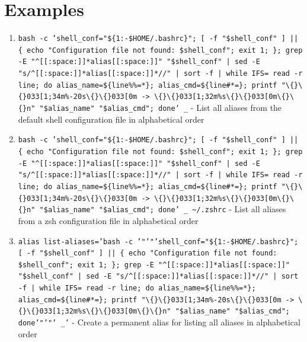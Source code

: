 \documentclass[openany]{book}
\begin{document}
\section*{Examples}
\begin{enumerate}
  \item \texttt{bash -c 'shell\_conf="\$\{1:-\$HOME/.bashrc\}"; [ -f "\$shell\_conf" ] || \{ echo "Configuration file not found: \$shell\_conf"; exit 1; \}; grep -E "\textasciicircum{}[[:space:]]*alias[[:space:]]" "\$shell\_conf" | sed -E "s/\textasciicircum{}[[:space:]]*alias[[:space:]]*//" | sort -f | while IFS= read -r line; do alias\_name=\$\{line\%\%=*\}; alias\_cmd=\$\{line\#*=\}; printf "\textbackslash\{\}\textbackslash\{\}033[1;34m\%-20s\textbackslash\{\}\textbackslash\{\}033[0m -> \textbackslash\{\}\textbackslash\{\}033[1;32m\%s\textbackslash\{\}\textbackslash\{\}033[0m\textbackslash\{\}\textbackslash\{\}n" "\$alias\_name" "\$alias\_cmd"; done' \_} - List all aliases from the default shell configuration file in alphabetical order
  \item \texttt{bash -c 'shell\_conf="\$\{1:-\$HOME/.bashrc\}"; [ -f "\$shell\_conf" ] || \{ echo "Configuration file not found: \$shell\_conf"; exit 1; \}; grep -E "\textasciicircum{}[[:space:]]*alias[[:space:]]" "\$shell\_conf" | sed -E "s/\textasciicircum{}[[:space:]]*alias[[:space:]]*//" | sort -f | while IFS= read -r line; do alias\_name=\$\{line\%\%=*\}; alias\_cmd=\$\{line\#*=\}; printf "\textbackslash\{\}\textbackslash\{\}033[1;34m\%-20s\textbackslash\{\}\textbackslash\{\}033[0m -> \textbackslash\{\}\textbackslash\{\}033[1;32m\%s\textbackslash\{\}\textbackslash\{\}033[0m\textbackslash\{\}\textbackslash\{\}n" "\$alias\_name" "\$alias\_cmd"; done' \_ \textasciitilde{}/.zshrc} - List all aliases from a zsh configuration file in alphabetical order
  \item \texttt{alias list-aliases='bash -c '"'"'shell\_conf="\$\{1:-\$HOME/.bashrc\}"; [ -f "\$shell\_conf" ] || \{ echo "Configuration file not found: \$shell\_conf"; exit 1; \}; grep -E "\textasciicircum{}[[:space:]]*alias[[:space:]]" "\$shell\_conf" | sed -E "s/\textasciicircum{}[[:space:]]*alias[[:space:]]*//" | sort -f | while IFS= read -r line; do alias\_name=\$\{line\%\%=*\}; alias\_cmd=\$\{line\#*=\}; printf "\textbackslash\{\}\textbackslash\{\}033[1;34m\%-20s\textbackslash\{\}\textbackslash\{\}033[0m -> \textbackslash\{\}\textbackslash\{\}033[1;32m\%s\textbackslash\{\}\textbackslash\{\}033[0m\textbackslash\{\}\textbackslash\{\}n" "\$alias\_name" "\$alias\_cmd"; done'"'"' \_'} - Create a permanent alias for listing all aliases in alphabetical order
\end{enumerate}
\end{document}
